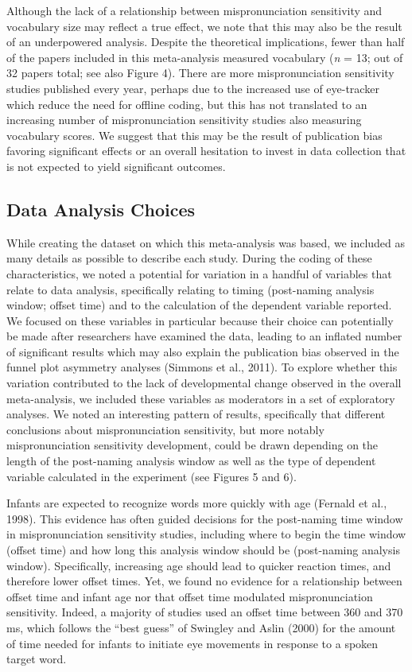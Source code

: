 \documentclass[man]{apa6}
\theoremstyle{definition}
\theoremstyle{definition}
\theoremstyle{definition}
\theoremstyle{remark}
\begin{document}
Although the lack of a relationship between mispronunciation sensitivity
and vocabulary size may reflect a true effect, we note that this may
also be the result of an underpowered analysis. Despite the theoretical
implications, fewer than half of the papers included in this
meta-analysis measured vocabulary (\emph{n} = 13; out of 32 papers
total; see also Figure 4). There are more mispronunciation sensitivity
studies published every year, perhaps due to the increased use of
eye-tracker which reduce the need for offline coding, but this has not
translated to an increasing number of mispronunciation sensitivity
studies also measuring vocabulary scores. We suggest that this may be
the result of publication bias favoring significant effects or an
overall hesitation to invest in data collection that is not expected to
yield significant outcomes.

\subsection{Data Analysis Choices}\label{data-analysis-choices}

While creating the dataset on which this meta-analysis was based, we
included as many details as possible to describe each study. During the
coding of these characteristics, we noted a potential for variation in a
handful of variables that relate to data analysis, specifically relating
to timing (post-naming analysis window; offset time) and to the
calculation of the dependent variable reported. We focused on these
variables in particular because their choice can potentially be made
after researchers have examined the data, leading to an inflated number
of significant results which may also explain the publication bias
observed in the funnel plot asymmetry analyses (Simmons et al., 2011).
To explore whether this variation contributed to the lack of
developmental change observed in the overall meta-analysis, we included
these variables as moderators in a set of exploratory analyses. We noted
an interesting pattern of results, specifically that different
conclusions about mispronunciation sensitivity, but more notably
mispronunciation sensitivity development, could be drawn depending on
the length of the post-naming analysis window as well as the type of
dependent variable calculated in the experiment (see Figures 5 and 6).

Infants are expected to recognize words more quickly with age (Fernald
et al., 1998). This evidence has often guided decisions for the
post-naming time window in mispronunciation sensitivity studies,
including where to begin the time window (offset time) and how long this
analysis window should be (post-naming analysis window). Specifically,
increasing age should lead to quicker reaction times, and therefore
lower offset times. Yet, we found no evidence for a relationship between
offset time and infant age nor that offset time modulated
mispronunciation sensitivity. Indeed, a majority of studies used an
offset time between 360 and 370 ms, which follows the \enquote{best
guess} of Swingley and Aslin (2000) for the amount of time needed for
infants to initiate eye movements in response to a spoken target word.
\end{document}
